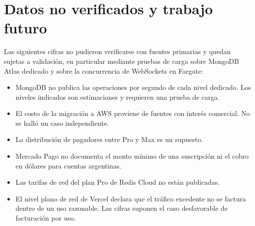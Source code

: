 \section{Datos no verificados y trabajo futuro}
Las siguientes cifras no pudieron verificarse con fuentes primarias y quedan sujetas a validación, en particular mediante pruebas de carga sobre MongoDB Atlas dedicado y sobre la concurrencia de WebSockets en Fargate:

\begin{itemize}
  \item MongoDB no publica las operaciones por segundo de cada nivel dedicado. Los niveles indicados son estimaciones y requieren una prueba de carga.
  \item El costo de la migración a AWS proviene de fuentes con interés comercial. No se halló un caso independiente.
  \item La distribución de pagadores entre Pro y Max es un supuesto.
  \item Mercado Pago no documenta el monto mínimo de una suscripción ni el cobro en dólares para cuentas argentinas.
  \item Las tarifas de red del plan Pro de Redis Cloud no están publicadas.
  \item El nivel plano de red de Vercel declara que el tráfico excedente no se factura dentro de un uso razonable. Las cifras suponen el caso desfavorable de facturación por uso.
\end{itemize}
